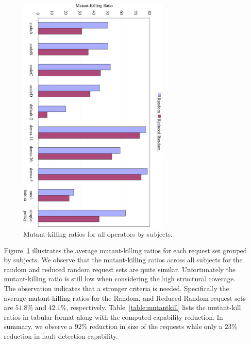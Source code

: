 \begin{figure}[t]
\centering
        \includegraphics[width=3in]{coverage/kill-by-subj}
    \caption{\label{fig:killbysubj}Mutant-killing ratios for all operators by subjects.}
\end{figure}
Figure~\ref{fig:killbysubj} illustrates the average mutant-killing
ratios for each request set grouped by subjects. We observe that the
mutant-killing ratios across all subjects for the random and reduced
random request sets are quite similar. Unfortunately the
mutant-killing ratio is still low when considering the high
structural coverage. The observation indicates that a stronger
criteria is needed. Specifically the average mutant-killing ratios
for the Random, and Reduced Random request sets are $51.8\%$ and
$42.1\%$, respectively. Table~\ref{table:mutantkill} lists the
mutant-kill ratios in tabular format along with the computed
capability reduction. In summary, we observe a $92\%$ reduction in
size of the requests while only a $23\%$ reduction in fault
detection capability.

